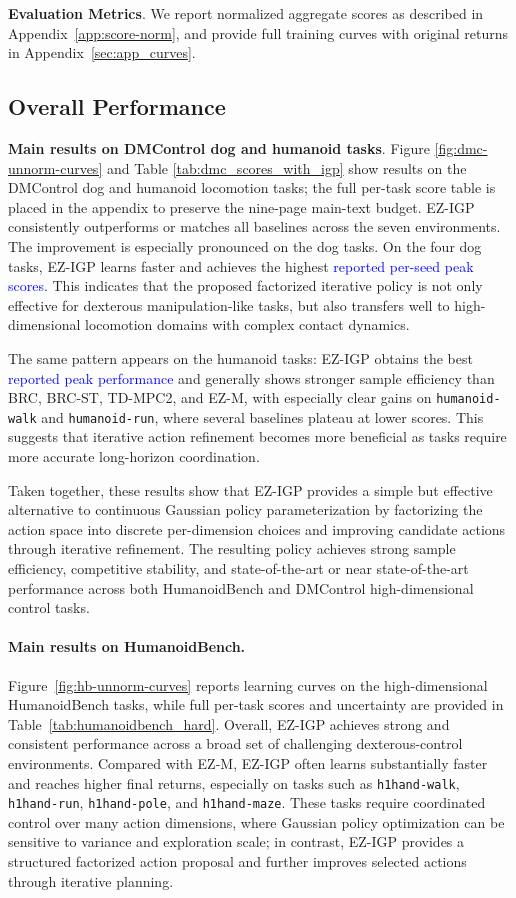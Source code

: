 \textbf{Evaluation Metrics}. 
We report normalized aggregate scores as described in Appendix~\ref{app:score-norm}, and provide full training curves with original returns in Appendix~\ref{sec:app_curves}.


\subsection{Overall Performance}

\textbf{Main results on DMControl dog and humanoid tasks}. Figure \ref{fig:dmc-unnorm-curves} and Table \ref{tab:dmc_scores_with_igp} show results on the DMControl dog and humanoid locomotion tasks; the full per-task score table is placed in the appendix to preserve the nine-page main-text budget. EZ-IGP consistently outperforms or matches all baselines across the seven environments. The improvement is especially pronounced on the dog tasks. On the four dog tasks, EZ-IGP learns faster and achieves the highest \textcolor{blue}{reported per-seed peak scores}. This indicates that the proposed factorized iterative policy is not only effective for dexterous manipulation-like tasks, but also transfers well to high-dimensional locomotion domains with complex contact dynamics.

The same pattern appears on the humanoid tasks: EZ-IGP obtains the best \textcolor{blue}{reported peak performance} and generally shows stronger sample efficiency than BRC, BRC-ST, TD-MPC2, and EZ-M, with especially clear gains on \texttt{humanoid-walk} and \texttt{humanoid-run}, where several baselines plateau at lower scores. This suggests that iterative action refinement becomes more beneficial as tasks require more accurate long-horizon coordination.

Taken together, these results show that EZ-IGP provides a simple but effective alternative to continuous Gaussian policy parameterization by factorizing the action space into discrete per-dimension choices and improving candidate actions through iterative refinement. The resulting policy achieves strong sample efficiency, competitive stability, and state-of-the-art or near state-of-the-art performance across both HumanoidBench and DMControl high-dimensional control tasks.


\paragraph{Main results on HumanoidBench.}
Figure~\ref{fig:hb-unnorm-curves} reports learning curves on the high-dimensional HumanoidBench tasks, while full per-task scores and uncertainty are provided in Table~\ref{tab:humanoidbench_hard}. Overall, EZ-IGP achieves strong and consistent performance across a broad set of challenging dexterous-control environments. Compared with EZ-M, EZ-IGP often learns substantially faster and reaches higher final returns, especially on tasks such as \texttt{h1hand-walk}, \texttt{h1hand-run}, \texttt{h1hand-pole}, and \texttt{h1hand-maze}. These tasks require coordinated control over many action dimensions, where Gaussian policy optimization can be sensitive to variance and exploration scale; in contrast, EZ-IGP provides a structured factorized action proposal and further improves selected actions through iterative planning.

